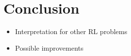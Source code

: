 \chapter{Conclusion}
\begin{itemize}
    \item Interpretation for other RL problems
    \item Possible improvements
\end{itemize}
